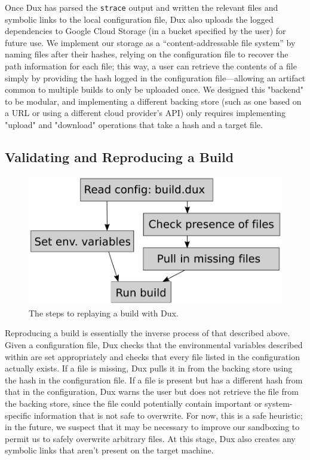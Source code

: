 \documentclass[10pt,conference]{IEEEtran}
\begin{document}
Once Dux has parsed the \texttt{strace} output and written the relevant files and symbolic links to
the local configuration file, Dux also uploads the logged dependencies to Google Cloud Storage (in a
bucket specified by the user) for future use. We implement our storage as a ``content-addressable
file system'' by naming files after their hashes, relying on the configuration file to recover
the path information for each file; this way, a user can retrieve the contents of a file simply by 
providing the hash logged in the configuration file---allowing an artifact common to multiple builds to
only be uploaded once. We designed this "backend" to be modular, and implementing a different backing store
(such as one based on a URL or using a different cloud provider's API) only requires implementing
"upload" and "download" operations that take a hash and a target file.

\subsection{Validating and Reproducing a Build}

\begin{figure}
\includegraphics[width=\columnwidth]{duxcheck}
\caption{The steps to replaying a build with Dux.}
\end{figure}

Reproducing a build is essentially the inverse process of that described above. Given a configuration file,
Dux checks that the environmental variables described within are set appropriately and checks that every
file listed in the configuration actually exists. If a file is missing, Dux pulls it in from the backing store
using the hash in the configuration file. If a file is present but has a different hash from that
in the configuration, Dux warns the user but does not retrieve the file from the backing store, since the file
could potentially contain important or system-specific information that is not safe to overwrite. For now,
this is a safe heuristic; in the future, we suspect that it may be necessary to improve our sandboxing to permit
us to safely overwrite arbitrary files. At this stage, Dux also creates any symbolic links that aren't present
on the target machine.
\end{document}
